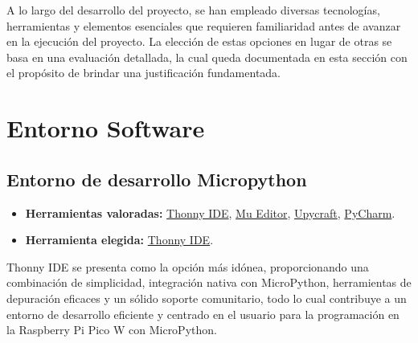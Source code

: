 
A lo largo del desarrollo del proyecto, se han empleado diversas tecnologías, herramientas y elementos esenciales que requieren familiaridad antes de avanzar en la ejecución del proyecto. La elección de estas opciones en lugar de otras se basa en una evaluación detallada, la cual queda documentada en esta sección con el propósito de brindar una justificación fundamentada.

\section{Entorno Software}
\subsection{Entorno de desarrollo Micropython}\label{4:MicroPython}
\begin{itemize}
	\item \textbf{Herramientas valoradas:} \href{https://thonny.org/}{Thonny IDE}, \href{https://codewith.mu/}{Mu Editor}, \href{https://dfrobot.gitbooks.io/upycraft/content/}{Upycraft}, \href{https://www.jetbrains.com/pycharm/}{PyCharm}.
    \item \textbf{Herramienta elegida:} \href{https://thonny.org/}{Thonny IDE}.
\end{itemize}

Thonny IDE se presenta como la opción más idónea, proporcionando una combinación de simplicidad, integración nativa con MicroPython, herramientas de depuración eficaces y un sólido soporte comunitario, todo lo cual contribuye a un entorno de desarrollo eficiente y centrado en el usuario para la programación en la Raspberry Pi Pico W con MicroPython.

